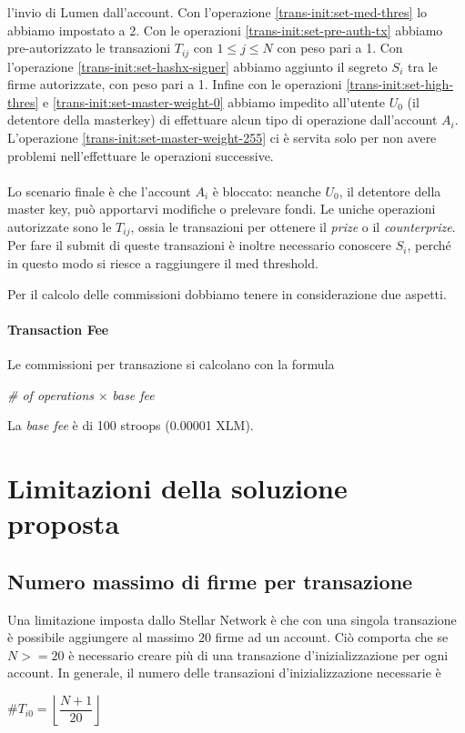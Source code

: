 l'invio di Lumen dall'account.
Con l'operazione \ref{trans-init:set-med-thres} lo abbiamo impostato a 2.
Con le operazioni \ref{trans-init:set-pre-auth-tx} abbiamo pre-autorizzato
le transazioni
$ T_{ij} $ con $ 1 \leq j \leq N $ con peso pari a 1.
Con l'operazione \ref{trans-init:set-hashx-signer} abbiamo aggiunto il segreto
$ S_i $ tra le firme autorizzate, con peso pari a 1.
Infine con le operazioni \ref{trans-init:set-high-thres} e
\ref{trans-init:set-master-weight-0} abbiamo impedito all'utente $ U_0 $ (il
detentore della masterkey) di effettuare alcun tipo di operazione dall'account $ A_i $.
L'operazione \ref{trans-init:set-master-weight-255} ci è servita solo per
non avere problemi
nell'effettuare le operazioni successive.
\\
\\
Lo scenario finale è che l'account $ A_i $ è bloccato: neanche $ U_0 $, il detentore
della master key, può apportarvi modifiche o prelevare fondi. Le uniche operazioni
autorizzate sono le $ T_{ij} $, ossia le transazioni per ottenere il \textit{prize}
o il \textit{counterprize}. Per fare il submit di queste transazioni è inoltre
necessario conoscere $ S_i $, perché in questo modo si riesce a raggiungere
il med threshold.


Per il calcolo delle commissioni dobbiamo tenere in considerazione due aspetti.
\paragraph{Transaction Fee} Le commissioni per transazione si calcolano con la formula
\begin{center}
	\textit{\# of operations} $ \times $ \textit{base fee}
\end{center}
La \textit{base fee} è di 100 stroops (0.00001 XLM).


\section{Limitazioni della soluzione proposta}

\subsection{Numero massimo di firme per transazione}
Una limitazione imposta dallo Stellar Network è che con
una singola transazione è possibile aggiungere al massimo 20 firme ad un account.
Ciò comporta che se $ N >= 20 $ è necessario creare più di una transazione
d'inizializzazione per ogni account.
In generale, il numero delle transazioni d'inizializzazione necessarie è
\begin{center}
	$ \# T_{i0} = \left\lfloor\dfrac{ N + 1 }{ 20 }\right\rfloor $
\end{center}

